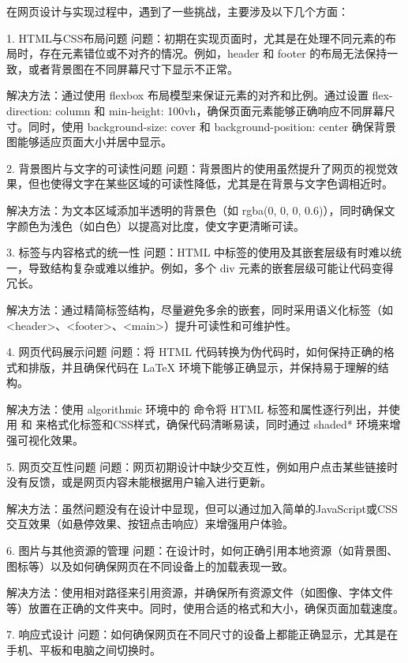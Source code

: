 \documentclass[supercite]{Experimental_Report}
\theoremstyle{definition}
\begin{document}
在网页设计与实现过程中，遇到了一些挑战，主要涉及以下几个方面：

1. HTML与CSS布局问题
   问题：初期在实现页面时，尤其是在处理不同元素的布局时，存在元素错位或不对齐的情况。例如，header 和 footer 的布局无法保持一致，或者背景图在不同屏幕尺寸下显示不正常。
   
   解决方法：通过使用 flexbox 布局模型来保证元素的对齐和比例。通过设置 flex-direction: column 和 min-height: 100vh，确保页面元素能够正确响应不同屏幕尺寸。同时，使用 background-size: cover 和 background-position: center 确保背景图能够适应页面大小并居中显示。

2. 背景图片与文字的可读性问题
   问题：背景图片的使用虽然提升了网页的视觉效果，但也使得文字在某些区域的可读性降低，尤其是在背景与文字色调相近时。
   
   解决方法：为文本区域添加半透明的背景色（如 rgba(0, 0, 0, 0.6)），同时确保文字颜色为浅色（如白色）以提高对比度，使文字更清晰可读。

3. 标签与内容格式的统一性
   问题：HTML 中标签的使用及其嵌套层级有时难以统一，导致结构复杂或难以维护。例如，多个 div 元素的嵌套层级可能让代码变得冗长。
   
   解决方法：通过精简标签结构，尽量避免多余的嵌套，同时采用语义化标签（如 <header>、<footer>、<main>）提升可读性和可维护性。

4. 网页代码展示问题
   问题：将 HTML 代码转换为伪代码时，如何保持正确的格式和排版，并且确保代码在 LaTeX 环境下能够正确显示，并保持易于理解的结构。
   
   解决方法：使用 algorithmic 环境中的 \State 命令将 HTML 标签和属性逐行列出，并使用 \textbf{} 和 \texttt{} 来格式化标签和CSS样式，确保代码清晰易读，同时通过 shaded* 环境来增强可视化效果。

5. 网页交互性问题
   问题：网页初期设计中缺少交互性，例如用户点击某些链接时没有反馈，或是网页内容未能根据用户输入进行更新。
   
   解决方法：虽然问题没有在设计中显现，但可以通过加入简单的JavaScript或CSS交互效果（如悬停效果、按钮点击响应）来增强用户体验。

6. 图片与其他资源的管理
   问题：在设计时，如何正确引用本地资源（如背景图、图标等）以及如何确保网页在不同设备上的加载表现一致。
   
   解决方法：使用相对路径来引用资源，并确保所有资源文件（如图像、字体文件等）放置在正确的文件夹中。同时，使用合适的格式和大小，确保页面加载速度。

7. 响应式设计
   问题：如何确保网页在不同尺寸的设备上都能正确显示，尤其是在手机、平板和电脑之间切换时。
   
\end{document}
